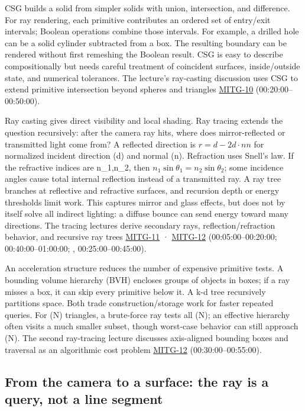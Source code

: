CSG builds a solid from simpler solids with union, intersection, and difference. For ray rendering, each primitive contributes an ordered set of entry/exit intervals; Boolean operations combine those intervals. For example, a drilled hole can be a solid cylinder subtracted from a box. The resulting boundary can be rendered without first remeshing the Boolean result. CSG is easy to describe compositionally but needs careful treatment of coincident surfaces, inside/outside state, and numerical tolerances. The lecture's ray-casting discussion uses CSG to extend primitive intersection beyond spheres and triangles \hyperref[04-visual-computing-ii-ch036-mitg-10---ray-casting-ii]{MITG-10} (00:20:00--00:50:00).

Ray casting gives direct visibility and local shading. Ray tracing extends the question recursively: after the camera ray hits, where does mirror-reflected or transmitted light come from? A reflected direction is \(r=d-2d\cdot nn\) for normalized incident direction (d) and normal (n). Refraction uses Snell's law. If the refractive indices are n\_1,n\_2, then \(n_1\sin\theta_1=n_2\sin\theta_2\); some incidence angles cause total internal reflection instead of a transmitted ray. A ray tree branches at reflective and refractive surfaces, and recursion depth or energy thresholds limit work. This captures mirror and glass effects, but does not by itself solve all indirect lighting: a diffuse bounce can send energy toward many directions. The tracing lectures derive secondary rays, reflection/refraction behavior, and recursive ray trees \hyperref[04-visual-computing-ii-ch036-mitg-11---ray-tracing]{MITG-11} · \hyperref[04-visual-computing-ii-ch036-mitg-12---ray-tracing-ii]{MITG-12} (00:05:00--00:20:00; 00:40:00--01:00:00; , 00:25:00--00:45:00).

An acceleration structure reduces the number of expensive primitive tests. A bounding volume hierarchy (BVH) encloses groups of objects in boxes; if a ray misses a box, it can skip every primitive below it. A k-d tree recursively partitions space. Both trade construction/storage work for faster repeated queries. For (N) triangles, a brute-force ray tests all (N); an effective hierarchy often visits a much smaller subset, though worst-case behavior can still approach (N). The second ray-tracing lecture discusses axis-aligned bounding boxes and traversal as an algorithmic cost problem \hyperref[04-visual-computing-ii-ch036-mitg-12---ray-tracing-ii]{MITG-12} (00:30:00--00:55:00).

\subsection{From the camera to a surface: the ray is a query, not a line segment}\label{04-visual-computing-ii-ch028-from-the-camera-to-a-surface-the-ray-is-a-query-not-a-line-segment}


